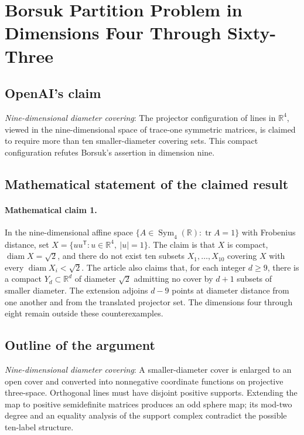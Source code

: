 \documentclass[11pt]{article}
\begin{document}
\section*{Borsuk Partition Problem in Dimensions Four Through Sixty-Three}

\subsection{OpenAI's claim}
\textit{Nine-dimensional diameter covering}: The projector configuration of lines in $\mathbb R^4$, viewed in the nine-dimensional space of trace-one symmetric matrices, is claimed to require more than ten smaller-diameter covering sets. This compact configuration refutes Borsuk’s assertion in dimension nine.

\subsection{Mathematical statement of the claimed result}
\paragraph{Mathematical claim 1.} In the nine-dimensional affine space $\{A\in\operatorname{Sym}_4(\mathbb R):\operatorname{tr}A=1\}$ with Frobenius distance, set $X=\{uu^{\mathsf T}:u\in\mathbb R^4,\ |u|=1\}$. The claim is that $X$ is compact, $\operatorname{diam}X=\sqrt2$, and there do not exist ten subsets $X_1,\ldots,X_{10}$ covering $X$ with every $\operatorname{diam}X_i<\sqrt2$. The article also claims that, for each integer $d\ge9$, there is a compact $Y_d\subset\mathbb R^d$ of diameter $\sqrt2$ admitting no cover by $d+1$ subsets of smaller diameter. The extension adjoins $d-9$ points at diameter distance from one another and from the translated projector set. The dimensions four through eight remain outside these counterexamples.

\subsection{Outline of the argument}
\textit{Nine-dimensional diameter covering}: A smaller-diameter cover is enlarged to an open cover and converted into nonnegative coordinate functions on projective three-space. Orthogonal lines must have disjoint positive supports. Extending the map to positive semidefinite matrices produces an odd sphere map; its mod-two degree and an equality analysis of the support complex contradict the possible ten-label structure.
\end{document}
